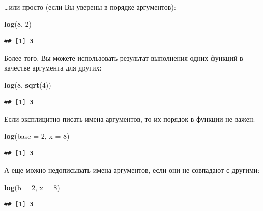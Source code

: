 \documentclass[
]{book}
\newenvironment{Shaded}{\begin{snugshade}}{\end{snugshade}}
\newcommand{\DataTypeTok}[1]{\textcolor[rgb]{0.13,0.29,0.53}{#1}}
\newcommand{\DecValTok}[1]{\textcolor[rgb]{0.00,0.00,0.81}{#1}}
\newcommand{\KeywordTok}[1]{\textcolor[rgb]{0.13,0.29,0.53}{\textbf{#1}}}
\newcommand{\NormalTok}[1]{#1}
\begin{document}
\ldots или просто (если Вы уверены в порядке аргументов):

\begin{Shaded}
\begin{Highlighting}[]
\KeywordTok{log}\NormalTok{(}\DecValTok{8}\NormalTok{, }\DecValTok{2}\NormalTok{)}
\end{Highlighting}
\end{Shaded}

\begin{verbatim}
## [1] 3
\end{verbatim}

Более того, Вы можете использовать результат выполнения одних функций в качестве аргумента для других:

\begin{Shaded}
\begin{Highlighting}[]
\KeywordTok{log}\NormalTok{(}\DecValTok{8}\NormalTok{, }\KeywordTok{sqrt}\NormalTok{(}\DecValTok{4}\NormalTok{))}
\end{Highlighting}
\end{Shaded}

\begin{verbatim}
## [1] 3
\end{verbatim}

Если эксплицитно писать имена аргументов, то их порядок в функции не важен:

\begin{Shaded}
\begin{Highlighting}[]
\KeywordTok{log}\NormalTok{(}\DataTypeTok{base =} \DecValTok{2}\NormalTok{, }\DataTypeTok{x =} \DecValTok{8}\NormalTok{)}
\end{Highlighting}
\end{Shaded}

\begin{verbatim}
## [1] 3
\end{verbatim}

А еще можно недописывать имена аргументов, если они не совпадают с другими:

\begin{Shaded}
\begin{Highlighting}[]
\KeywordTok{log}\NormalTok{(}\DataTypeTok{b =} \DecValTok{2}\NormalTok{, }\DataTypeTok{x =} \DecValTok{8}\NormalTok{)}
\end{Highlighting}
\end{Shaded}

\begin{verbatim}
## [1] 3
\end{verbatim}
\end{document}
